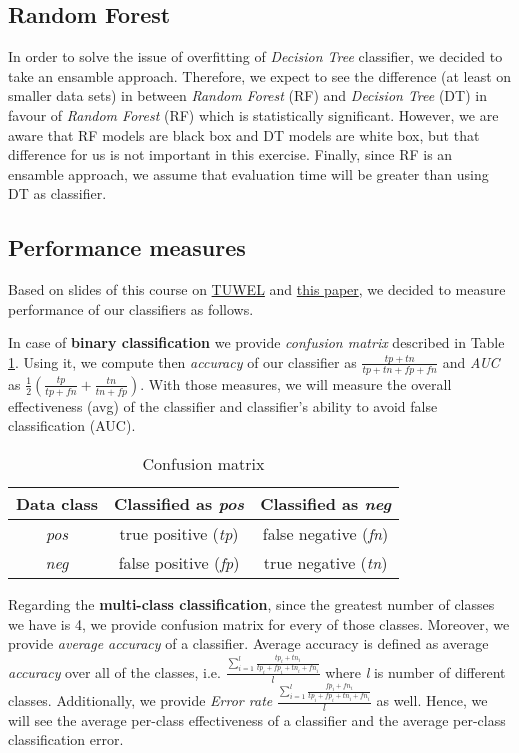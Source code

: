 \documentclass[11pt,a4paper,titlepage]{article}
\begin{document}
\subsection{Random Forest}
In order to solve the issue of overfitting of \textit{Decision Tree} classifier, we decided to take an ensamble approach. Therefore, we expect to see the difference (at least on smaller data sets) in between \textit{Random Forest} (RF) and \textit{Decision Tree} (DT) in favour of \textit{Random Forest} (RF) which is statistically significant. However, we are aware that RF models are black box and DT models are white box, but that difference for us is not important in this exercise. Finally, since RF is an ensamble approach, we assume that evaluation time will be greater than using DT as classifier.

\subsection{Performance measures}
Based on slides of this course on \href{tuwel.tuwien.ac.at}{TUWEL} and \href{http://rali.iro.umontreal.ca/rali/sites/default/files/publis/SokolovaLapalme-JIPM09.pdf}{this paper}, we decided to measure performance of our classifiers as follows.

In case of \textbf{binary classification} we  provide \textit{confusion matrix} described in Table \ref{table:confusionMatrix}. Using it, we compute then \textit{accuracy} of our classifier as $\frac{tp + tn}{tp + tn + fp + fn}$ and \textit{AUC} as $\frac{1}{2} (\frac{tp}{tp + fn} + \frac{tn}{tn+fp})$.  With those measures, we will measure the overall effectiveness (avg) of the classifier and classifier’s ability to avoid false classification (AUC).

  \begin{table}
  \centering
  \begin{tabular}{| c | c | c |}
    \hline
    Data class & Classified as \textit{pos} & Classified as \textit{neg} \\ \hline
    \textit{pos} & true positive (\textit{tp}) & false negative (\textit{fn}) \\ \hline
    \textit{neg} & false positive (\textit{fp}) & true negative (\textit{tn}) \\
    \hline
  \end{tabular}
  \caption{Confusion matrix}
  \label{table:confusionMatrix}
  \end{table}

Regarding the \textbf{multi-class classification}, since the greatest number of classes we have is 4, we  provide confusion matrix for every of those classes. Moreover, we provide \textit{average accuracy} of a classifier. Average accuracy is defined as average \textit{accuracy} over all of the classes, i.e. $\frac{\sum_{i=1}^{l}\frac{tp_i + tn_i}{tp_i + fp_i + tn_i + fn_i}}{l}$ where \textit{l} is number of different classes. Additionally, we provide \textit{Error rate} $\frac{\sum_{i=1}^{l}\frac{fp_i + fn_i}{tp_i + fp_i + tn_i + fn_i}}{l}$ as well. Hence, we will see the average per-class effectiveness of a classifier and the average per-class classification error.
\end{document}
